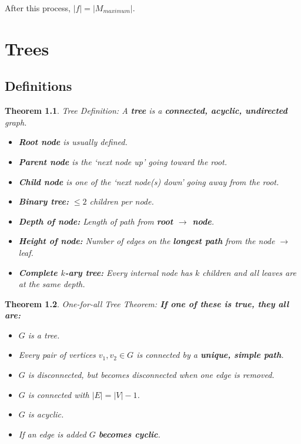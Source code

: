 \documentclass[a4paper,12pt]{report}
\newtheorem{theorem}{Theorem}
\begin{document}
After this process, $|f| = |M_{maximum}|$.















\chapter{Trees}

\section{Definitions}

\begin{theorem}{Tree Definition:}
A \textbf{tree} is a \textbf{connected, acyclic, undirected} graph.
\begin{itemize}
\item \textbf{Root node} is usually defined.
\item \textbf{Parent node} is the `next node up' going toward the root.
\item \textbf{Child node} is one of the `next node(s) down' going away from the root.
\item \textbf{Binary tree: } $\leq 2$ children per node.
\item \textbf{Depth of node: } Length of path from \textbf{root $\to$ node}.
\item \textbf{Height of node: } Number of edges on the \textbf{longest path} from the node $\to$ leaf. 
\item \textbf{Complete $k$-ary tree: } Every \textit{internal node} has $k$ children and all leaves are at the same depth.
\end{itemize}
\end{theorem}


\begin{theorem}{One-for-all Tree Theorem:}
\textbf{If one of these is true, they all are: } 
\begin{itemize}
\item $G$ is a tree.
\item Every pair of vertices $v_1, v_2\in G$ is connected by a \textbf{unique, simple path}.
\item $G$ is disconnected, but becomes disconnected when one edge is removed.
\item $G$ is connected with $|E| = |V|-1$.
\item $G$ is acyclic.
\item If an edge is added $G$ \textbf{becomes cyclic}.
\end{itemize}
\end{theorem}
\end{document}
